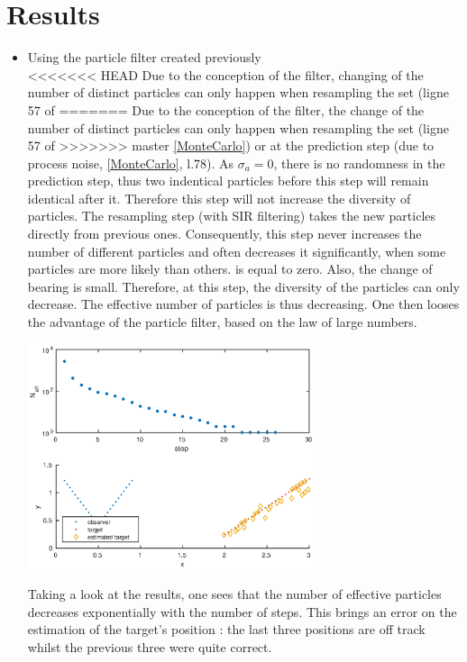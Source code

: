 \documentclass[english,DIV=13]{scrreprt}
\begin{document}
\section*{Results}
\begin{itemize}
\item Using the particle filter created previously\\
<<<<<<< HEAD
Due to the conception of the filter, changing of the number of distinct particles can only happen when resampling the set (ligne 57 of
=======
Due to the conception of the filter, the change of the number of distinct particles can only happen when resampling the set (ligne 57 of
>>>>>>> master
\ref{MonteCarlo}) or at the prediction step (due to process noise, \ref{MonteCarlo}, l.78).
As $\sigma_a = 0$, there is no randomness in the prediction step, thus two indentical particles before this step will remain identical
after it. Therefore this step will not increase the diversity of particles.
The resampling step (with SIR filtering) takes the new particles directly from previous ones. Consequently, this step never
increases the number of different particles and often decreases it significantly, when some particles are more likely than others.
is equal to zero. Also, the change of bearing is small. Therefore, at this step,  the diversity of the particles can only decrease.
The effective number of particles is thus decreasing. One then looses the advantage of the particle filter, based on
the law of large numbers.\\
\begin{center}
 \includegraphics[width=0.66\textwidth]{img/q51.eps}
\end{center}
Taking a look at the results, one sees that the number of effective particles decreases exponentially with the number of steps.
This brings an error on the estimation of the target's position : the last three positions are off track whilst the previous three
were quite correct.


\end{itemize}
\end{document}
